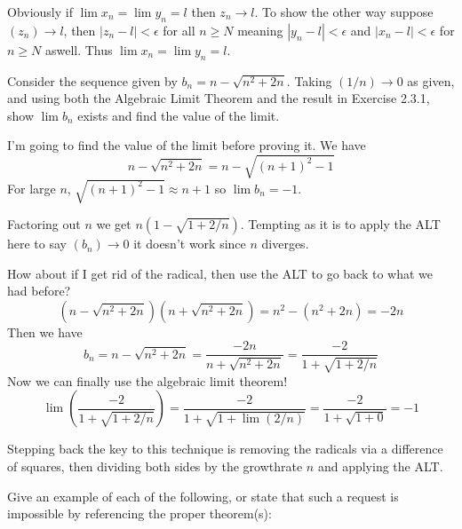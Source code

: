 \begin{solution}
  Obviously if $\lim x_n = \lim y_n = l$ then $z_n \to l$. To show the other way suppose $(z_n) \to l$, then $|z_n - l| < \epsilon$ for all $n \ge N$ meaning $|y_n - l| < \epsilon$ and $|x_n - l| < \epsilon$ for $n \ge N$ aswell. Thus $\lim x_n = \lim y_n = l$.
\end{solution}

\begin{exercise}
  Consider the sequence given by $b_{n}=n-\sqrt{n^{2}+2 n}$. Taking $(1 / n) \rightarrow 0$ as given, and using both the Algebraic Limit Theorem and the result in Exercise 2.3.1, show $\lim b_{n}$ exists and find the value of the limit.
\end{exercise}

\begin{solution}
  I'm going to find the value of the limit before proving it. We have
  $$
  n - \sqrt{n^2 + 2n} = n - \sqrt{(n + 1)^2 - 1}
  $$
  For large $n$, $\sqrt{(n + 1)^2 - 1} \approx n + 1$ so $\lim b_n = -1$.

  Factoring out $n$ we get $n\left(1 - \sqrt{1 + 2/n}\right)$. Tempting as it is to apply the ALT here to say $(b_n) \to 0$ it doesn't work since $n$ diverges.

  How about if I get rid of the radical, then use the ALT to go back to what we had before?
  $$
  (n - \sqrt{n^2 + 2n})(n + \sqrt{n^2 + 2n}) = n^2 - (n^2 + 2n) = -2n
  $$
  Then we have
  $$
  b_n = n - \sqrt{n^2 + 2n} = \frac{-2n}{n + \sqrt{n^2 + 2n}} = \frac{-2}{1 + \sqrt{1 + 2/n}}
  $$
  Now we can finally use the algebraic limit theorem!
  $$
  \lim\left(\frac{-2}{1 + \sqrt{1 + 2/n}}\right) = \frac{-2}{1 + \sqrt{1 + \lim\left(2/n\right)}} = \frac{-2}{1 + \sqrt{1 + 0}} = -1
  $$

  Stepping back the key to this technique is removing the radicals via a difference of squares, then dividing both sides by the growthrate $n$ and applying the ALT.
\end{solution}

\begin{exercise}
  Give an example of each of the following, or state that such a request is impossible by referencing the proper theorem(s):
\end{exercise}


